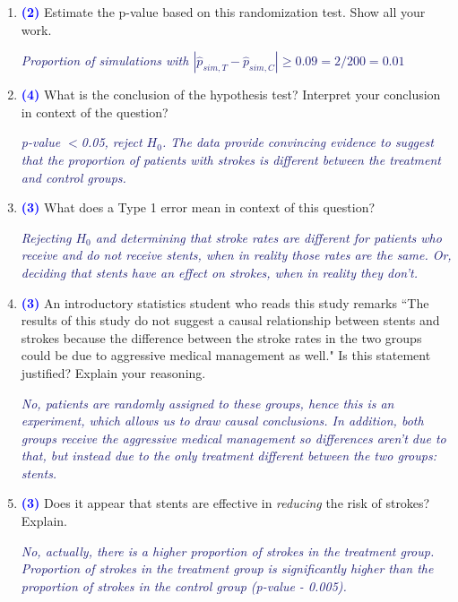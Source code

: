 \documentclass[11pt]{article}
\newcommand{\soln}[1]{\textcolor{MidnightBlue}{\textit{#1}}}	%
\newcommand{\pts}[1]{ \textbf{{\footnotesize \textcolor{blue}{(#1)}}} }	%
\begin{document}
\begin{enumerate}
\begin{enumerate}
\vfill

\pagebreak

%

\item \pts{2} Estimate the p-value based on this randomization test. Show all your work.

\soln{Proportion of simulations with $|\hat{p}_{sim,T} - \hat{p}_{sim,C}| \ge 0.09 = 2 / 200 = 0.01$}
$\:$ \\

\item \pts{4} What is the conclusion of the hypothesis test? Interpret your conclusion in context of the question?

\soln{p-value $<$0.05, reject $H_0$. The data provide convincing evidence to suggest that the proportion of patients with strokes is different between the treatment and control groups.}
$\:$ \\

\item \pts{3} What does a Type 1 error mean in context of this question?

\soln{Rejecting $H_0$ and determining that stroke rates are different for patients who receive and do not receive stents, when in reality those rates are the same. Or, deciding that stents have an effect on strokes, when in reality they don't.}
$\:$ \\

\item \pts{3} An introductory statistics student who reads this study remarks ``The results of this study do not suggest a causal relationship between stents and strokes because the difference between the stroke rates in the two groups could be due to aggressive medical management as well." Is this statement justified? Explain your reasoning.

\soln{No, patients are randomly assigned to these groups, hence this is an experiment, which allows us to draw causal conclusions. In addition, both groups receive the aggressive medical management so differences aren't due to that, but instead due to the only treatment different between the two groups: stents.}
$\:$ \\

\item \pts{3} Does it appear that stents are effective in \emph{reducing} the risk of strokes? Explain.

\soln{No, actually, there is a higher proportion of strokes in the treatment group. Proportion of strokes in the treatment group is significantly higher than the proportion of strokes in the control group (p-value - 0.005).}


\end{enumerate}
\end{enumerate}
\end{document}
